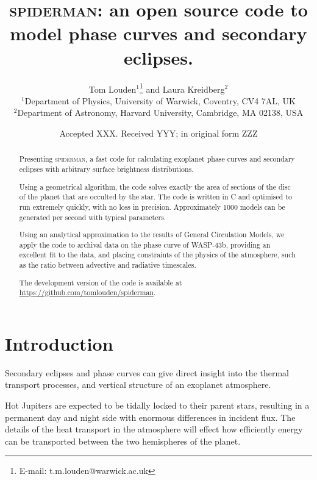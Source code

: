 \documentclass[a4paper,fleqn,usenatbib]{mnras}
\title[spiderman]{\textsc{spiderman}: an open source code to model phase curves and secondary eclipses.}
\author[T. Louden, L. Kreidberg]{Tom Louden$^{1}$\thanks{E-mail: t.m.louden@warwick.ac.uk} and Laura Kreidberg$^{2}$\\
$^{1}$Department of Physics, University of Warwick, Coventry, CV4 7AL, UK\\
$^{2}$Department of Astronomy, Harvard University, Cambridge, MA 02138, USA}
\date{Accepted XXX. Received YYY; in original form ZZZ}
\begin{document}
\label{firstpage}
\pagerange{\pageref{firstpage}--\pageref{lastpage}}
\maketitle

\begin{abstract}

Presenting \textsc{spiderman}, a fast code for calculating exoplanet phase curves and secondary eclipses with arbitrary surface brightness distributions.

Using a geometrical algorithm, the code solves exactly the area of sections of the disc of the planet that are occulted by the star. The code is written in C and optimised to run extremely quickly, with no loss in precision. Approximately 1000 models can be generated per second with typical parameters.

Using an analytical approximation to the results of General Circulation Models, we apply the code to archival data on the phase curve of WASP-43b, providing an excellent fit to the data, and placing constraints of the physics of the atmosphere, such as the ratio between advective and radiative timescales.

The development version of the code is available at \url{https://github.com/tomlouden/spiderman}.

\end{abstract}

\begin{keywords}
\end{keywords}



\section{Introduction}\label{sec:introduction}

Secondary eclipses and phase curves can give direct insight into the thermal transport processes, and vertical structure of an exoplanet atmosphere.

Hot Jupiters are expected to be tidally locked to their parent stars, resulting in a permanent day and night side with enormous differences in incident flux. The details of the heat transport in the atmosphere will effect how efficiently energy can be transported between the two hemispheres of the planet.
\end{document}
